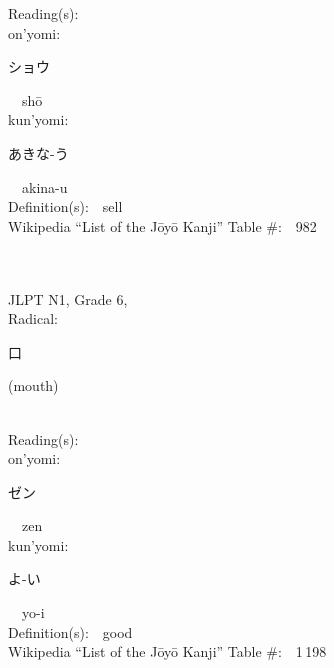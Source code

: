 \begin{multicols}{2}
Reading(s):\ \ \\
{\hspace*{1em}}on'yomi:\ \ \\
{\hspace*{2em}}{\begin{CJK}{UTF8}{min} ショウ \end{CJK}}\ \ sh\=o\ \ \\
{\hspace*{1em}}kun'yomi:\ \ \\
{\hspace*{2em}}{\begin{CJK}{UTF8}{min} あきな-う \end{CJK}}\ \ akina-u\ \ \\
Definition(s):\ \ sell \\
Wikipedia ``List of the J\=oy\=o Kanji'' Table \#:\ \ 982 \\
\ \ \\
{\fontsize{34pt}{40pt}  }\ \ \\  %
{JLPT N1, Grade 6, \\Radical:\ \ {\begin{CJK}{UTF8}{min} 口 \end{CJK}} (mouth) } \\
Reading(s):\ \ \\
{\hspace*{1em}}on'yomi:\ \ \\
{\hspace*{2em}}{\begin{CJK}{UTF8}{min} ゼン \end{CJK}}\ \ zen\ \ \\
{\hspace*{1em}}kun'yomi:\ \ \\
{\hspace*{2em}}{\begin{CJK}{UTF8}{min} よ-い \end{CJK}}\ \ yo-i\ \ \\
Definition(s):\ \ good \\
Wikipedia ``List of the J\=oy\=o Kanji'' Table \#:\ \ 1\,198 \\
\ \ \\
{\fontsize{34pt}{40pt}  }\ \ \\  %

\end{multicols}
